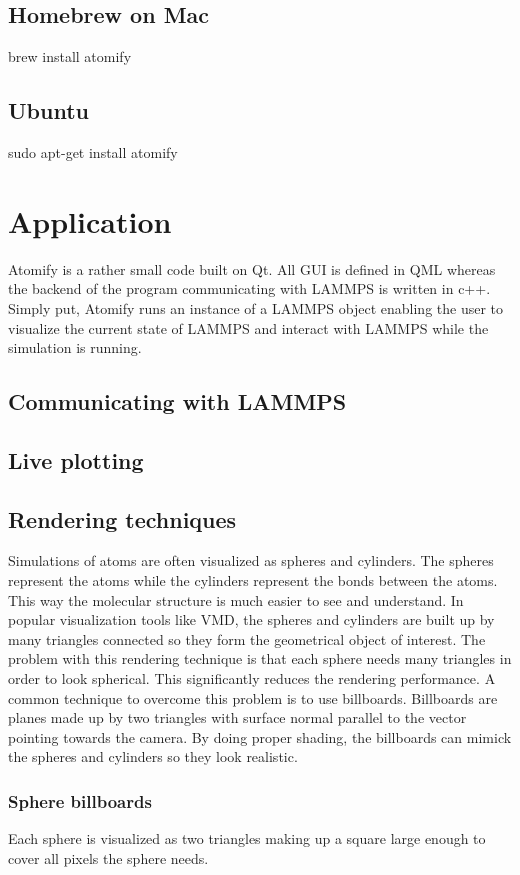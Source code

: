 \documentclass[aps,pre,twocolumn,letterpaper,floatfix,showpacs]{revtex4}
\begin{document}
\subsection{Homebrew on Mac}
brew install atomify

\subsection{Ubuntu}
sudo apt-get install atomify

\section{Application}
Atomify is a rather small code built on Qt. All GUI is defined in QML whereas the backend of the program communicating with LAMMPS is written in c++. Simply put, Atomify runs an instance of a LAMMPS object enabling the user to visualize the current state of LAMMPS and interact with LAMMPS while the simulation is running. 

\subsection{Communicating with LAMMPS}


\subsection{Live plotting}


\subsection{Rendering techniques}
Simulations of atoms are often visualized as spheres and cylinders. The spheres represent the atoms while the cylinders represent the bonds between the atoms. This way the molecular structure is much easier to see and understand. In popular visualization tools like VMD, the spheres and cylinders are built up by many triangles connected so they form the geometrical object of interest. The problem with this rendering technique is that each sphere needs many triangles in order to look spherical. This significantly reduces the rendering performance. A common technique to overcome this problem is to use billboards. Billboards are planes made up by two triangles with surface normal parallel to the vector pointing towards the camera. By doing proper shading, the billboards can mimick the spheres and cylinders so they look realistic.

\subsubsection*{Sphere billboards}
Each sphere is visualized as two triangles making up a square large enough to cover all pixels the sphere needs. 
\end{document}
